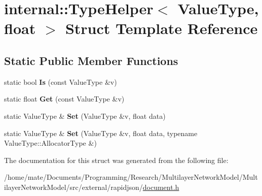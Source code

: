 \hypertarget{structinternal_1_1TypeHelper_3_01ValueType_00_01float_01_4}{}\section{internal\+:\+:Type\+Helper$<$ Value\+Type, float $>$ Struct Template Reference}
\label{structinternal_1_1TypeHelper_3_01ValueType_00_01float_01_4}
\subsection*{Static Public Member Functions}
\begin{DoxyCompactItemize}
\item 
static bool {\bfseries Is} (const Value\+Type \&v)\hypertarget{structinternal_1_1TypeHelper_3_01ValueType_00_01float_01_4_a1108488a02868bb91c3c14f4598bbebc}{}\label{structinternal_1_1TypeHelper_3_01ValueType_00_01float_01_4_a1108488a02868bb91c3c14f4598bbebc}

\item 
static float {\bfseries Get} (const Value\+Type \&v)\hypertarget{structinternal_1_1TypeHelper_3_01ValueType_00_01float_01_4_aa681e0d25878a7a770b0be82322b435a}{}\label{structinternal_1_1TypeHelper_3_01ValueType_00_01float_01_4_aa681e0d25878a7a770b0be82322b435a}

\item 
static Value\+Type \& {\bfseries Set} (Value\+Type \&v, float data)\hypertarget{structinternal_1_1TypeHelper_3_01ValueType_00_01float_01_4_a28318c2063421cf18dfa23d16352a3b8}{}\label{structinternal_1_1TypeHelper_3_01ValueType_00_01float_01_4_a28318c2063421cf18dfa23d16352a3b8}

\item 
static Value\+Type \& {\bfseries Set} (Value\+Type \&v, float data, typename Value\+Type\+::\+Allocator\+Type \&)\hypertarget{structinternal_1_1TypeHelper_3_01ValueType_00_01float_01_4_a3a0d8783f6228504058c427a16687bdf}{}\label{structinternal_1_1TypeHelper_3_01ValueType_00_01float_01_4_a3a0d8783f6228504058c427a16687bdf}

\end{DoxyCompactItemize}


The documentation for this struct was generated from the following file\+:\begin{DoxyCompactItemize}
\item 
/home/mate/\+Documents/\+Programming/\+Research/\+Multilayer\+Network\+Model/\+Multilayer\+Network\+Model/src/external/rapidjson/\hyperlink{document_8h}{document.\+h}\end{DoxyCompactItemize}
